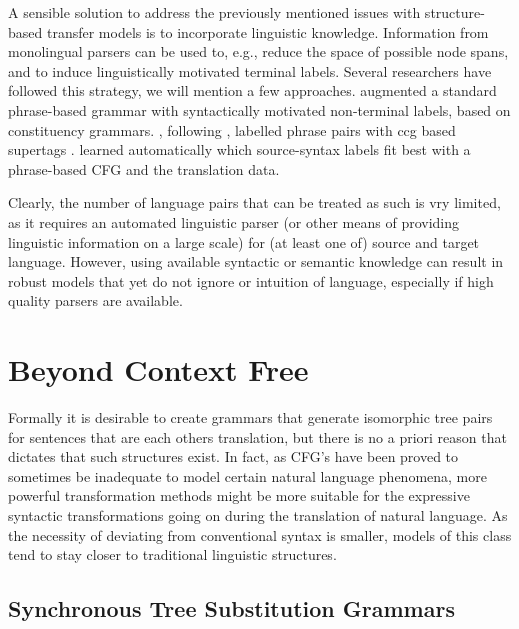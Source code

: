 A sensible solution to address the previously mentioned issues with structure-based transfer models is to incorporate linguistic knowledge. Information from monolingual parsers can be used to, e.g., reduce the space of possible node spans, and to induce linguistically motivated terminal labels. Several researchers have followed this strategy, we will mention a few approaches. \cite{zollmann2006syntax} augmented a standard phrase-based grammar with syntactically motivated non-terminal labels, based on constituency grammars. \cite{almaghout2010ccg}, following \cite{hassan2007supertagged}, labelled phrase pairs with ccg based supertags \citep{steedman2011combinatory}. \cite{mylonakis2011learning} learned automatically which source-syntax labels fit best with a phrase-based CFG and the translation data.

Clearly, the number of language pairs that can be treated as such is vry limited, as it requires an automated linguistic parser (or other means of providing linguistic information on a large scale) for (at least one of) source and target language. However, using available syntactic or semantic knowledge can result in robust models that yet do not ignore or intuition of language, especially if high quality parsers are available.

\section{Beyond Context Free}
\label{sec:bcf}

Formally it is desirable to create grammars that generate isomorphic tree pairs for sentences that are each others translation, but there is no a priori reason that dictates that such structures exist. In fact, as CFG's have been proved to sometimes be inadequate to model certain natural language phenomena, more powerful transformation methods might be more suitable for the expressive syntactic transformations going on during the translation of natural language. As the necessity of deviating from conventional syntax is smaller, models of this class tend to stay closer to traditional linguistic structures.

\subsection{Synchronous Tree Substitution Grammars}

